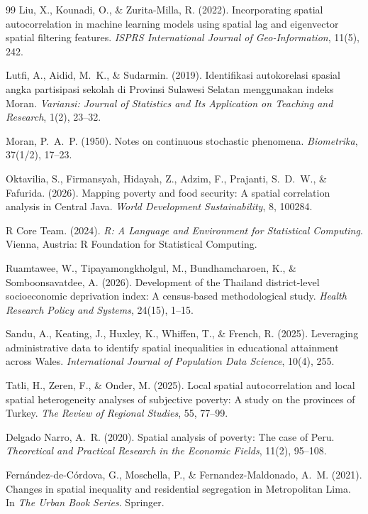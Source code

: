 \documentclass[12pt,a4paper,twoside]{article}
\begin{document}
\begin{thebibliography}{99}
Liu, X., Kounadi, O., \& Zurita-Milla, R. (2022).
Incorporating spatial autocorrelation in machine learning models using spatial
lag and eigenvector spatial filtering features.
\textit{ISPRS International Journal of Geo-Information}, 11(5), 242.

Lutfi, A., Aidid, M.~K., \& Sudarmin. (2019).
Identifikasi autokorelasi spasial angka partisipasi sekolah di {Provinsi
Sulawesi Selatan} menggunakan indeks {Moran}.
\textit{Variansi: Journal of Statistics and Its Application on Teaching and
Research}, 1(2), 23--32.

Moran, P.~A.~P. (1950).
Notes on continuous stochastic phenomena.
\textit{Biometrika}, 37(1/2), 17--23.

Oktavilia, S., Firmansyah, Hidayah, Z., Adzim, F., Prajanti, S.~D.~W.,
\& Fafurida. (2026).
Mapping poverty and food security: A spatial correlation analysis in
{Central Java}.
\textit{World Development Sustainability}, 8, 100284.

{R Core Team}. (2024).
\textit{R: A Language and Environment for Statistical Computing}.
Vienna, Austria: R Foundation for Statistical Computing.

Ruamtawee, W., Tipayamongkholgul, M., Bundhamcharoen, K.,
\& Somboonsavatdee, A. (2026).
Development of the {Thailand} district-level socioeconomic deprivation index:
A census-based methodological study.
\textit{Health Research Policy and Systems}, 24(15), 1--15.

Sandu, A., Keating, J., Huxley, K., Whiffen, T., \& French, R. (2025).
Leveraging administrative data to identify spatial inequalities in educational
attainment across {Wales}.
\textit{International Journal of Population Data Science}, 10(4), 255.

Tatli, H., Zeren, F., \& Onder, M. (2025).
Local spatial autocorrelation and local spatial heterogeneity analyses of
subjective poverty: A study on the provinces of {Turkey}.
\textit{The Review of Regional Studies}, 55, 77--99.

Delgado Narro, A.~R. (2020).
Spatial analysis of poverty: The case of {Peru}.
\textit{Theoretical and Practical Research in the Economic Fields},
11(2), 95--108.

Fern\'andez-de-C\'ordova, G., Moschella, P., \& Fernandez-Maldonado, A.~M. (2021).
Changes in spatial inequality and residential segregation in {Metropolitan Lima}.
In \textit{The Urban Book Series}. Springer.


\end{thebibliography}
\end{document}
